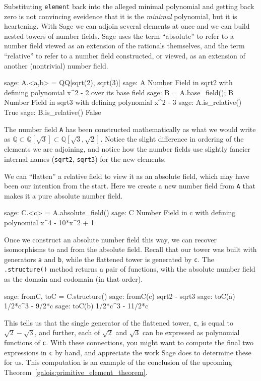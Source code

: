 %
Substituting \verb?element? back into the alleged minimal polynomial and getting back zero is not convincing eveidence that it is the \emph{minimal} polynomial, but it is heartening.
%
%
With Sage we can adjoin several elements at once and we can build nested towers of number fields.  Sage uses the term ``absolute'' to refer to a number field viewed as an extension of the rationals themselves, and the term ``relative'' to refer to a number field constructed, or viewed, as an extension of another (nontrivial) number field.
%
\begin{sageexample}
sage: A.<a,b> = QQ[sqrt(2), sqrt(3)]
sage: A
Number Field in sqrt2 with defining polynomial x^2 - 2 over
its base field
sage: B = A.base_field(); B
Number Field in sqrt3 with defining polynomial x^2 - 3
sage: A.is_relative()
True
sage: B.is_relative()
False
\end{sageexample}
%
The number field \verb?A? has been constructed mathematically as what we would write as ${\mathbb Q}\subset{\mathbb Q}[\sqrt{3}]\subset{\mathbb Q}[\sqrt{3},\sqrt{2}]$.  Notice the slight difference in ordering of the elements we are adjoining, and notice how the number fields use slightly fancier internal names (\verb?sqrt2?, \verb?sqrt3?) for the new elements.\par
%
We can ``flatten'' a relative field to view it as an absolute field, which may have been our intention from the start.  Here we create a new number field from \verb?A? that makes it a pure absolute number field.
%
\begin{sageexample}
sage: C.<c> = A.absolute_field()
sage: C
Number Field in c with defining polynomial x^4 - 10*x^2 + 1
\end{sageexample}
%
Once we construct an absolute number field this way, we can recover isomorphisms to and from the absolute field.  Recall that our tower was built with generators \verb?a? and \verb?b?, while the flattened tower is generated by \verb?c?.  The \verb?.structure()? method returns a pair of functions, with the absolute number field as the domain and codomain (in that order).
%
\begin{sageexample}
sage: fromC, toC = C.structure()
sage: fromC(c)
sqrt2 - sqrt3
sage: toC(a)
1/2*c^3 - 9/2*c
sage: toC(b)
1/2*c^3 - 11/2*c
\end{sageexample}
%
This tells us that the single generator of the flattened tower, \verb?c?, is equal to $\sqrt{2}-\sqrt{3}$, and further, each of $\sqrt{2}$ and $\sqrt{3}$ can be expressed as polynomial functions of \verb?c?.  With these connections, you might want to compute the final two expressions in \verb?c? by hand, and appreciate the work Sage does to determine these for us.  This computation is an example of the conclusion of the upcoming Theorem~\ref{galois:primitive_element_theorem}.\par
